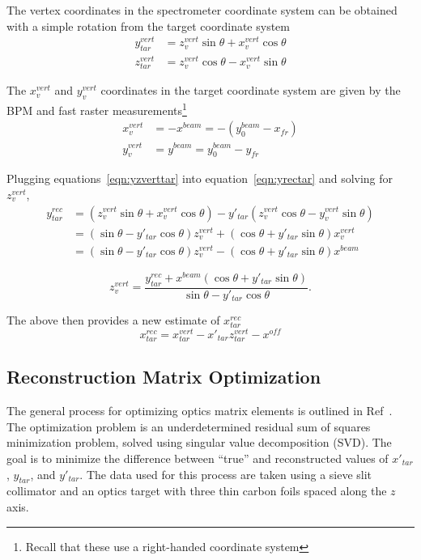 The vertex coordinates in the spectrometer coordinate system can be obtained
with a simple rotation from the target coordinate system
\begin{align} \label{eqn:yzverttar}
    y^{vert}_{tar} &= z^{vert}_v \sin\theta + x^{vert}_v \cos\theta \\
    z^{vert}_{tar} &= z^{vert}_v \cos\theta - x^{vert}_v \sin\theta
\end{align}

The $x^{vert}_{v}$ and $y^{vert}_{v}$ coordinates in the
target coordinate system are given by the BPM and fast raster
measurements\footnote{Recall that these use a right-handed coordinate system}
\begin{align}
    x^{vert}_v &= -x^{beam} = -(y_0^{beam} - x_{fr}) \\
    y^{vert}_v &= y^{beam} = y_0^{beam} - y_{fr}
\end{align}

Plugging equations~\ref{eqn:yzverttar} into equation~\ref{eqn:yrectar} and
solving for $z^{vert}_v$,
\begin{align}
    y^{rec}_{tar} &= (z^{vert}_v \sin\theta + x^{vert}_v \cos\theta) -
                     y'_{tar} (z^{vert}_v \cos\theta - y^{vert}_v \sin\theta) \\
                  &= (\sin\theta-y'_{tar}\cos\theta)z^{vert}_v +
                     (\cos\theta + y'_{tar} \sin\theta) x^{vert}_v \\
                  &= (\sin\theta-y'_{tar}\cos\theta)z^{vert}_v -
                     (\cos\theta + y'_{tar} \sin\theta) x^{beam}
\end{align}

\begin{equation}
    z^{vert}_v = \frac{y^{rec}_{tar} + x^{beam} (\cos\theta + y'_{tar} \sin\theta)}
                      {\sin\theta - y'_{tar}\cos\theta}.
\end{equation}

The above then provides a new estimate of $x^{rec}_{tar}$
\begin{equation}
    x^{rec}_{tar} = x^{vert}_{tar} - x'_{tar}z^{vert}_{tar} - x^{off}
\end{equation}

\subsection{Reconstruction Matrix Optimization}
The general process for optimizing optics matrix elements is outlined in
Ref~\cite{Bericic_2017}.
The optimization problem is an underdetermined residual sum of squares
minimization problem, solved using singular value decomposition (SVD).
The goal is to minimize the difference between ``true'' and reconstructed
values of $x'_{tar}$, $y_{tar}$, and $y'_{tar}$.
The data used for this process are taken using a sieve slit collimator and
an optics target with three thin carbon foils spaced along the $z$ axis.


